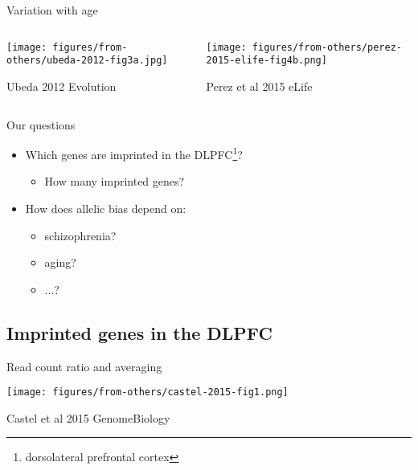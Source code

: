 \documentclass{beamer}
\begin{document}
\begin{frame}[label=previous-age-studies]{Variation with age}
\begin{columns}[t]
\begin{column}{0.5\textwidth}

\texttt{[image: figures/from-others/ubeda-2012-fig3a.jpg]}

{\tiny Ubeda 2012 Evolution}
\end{column}

\begin{column}{0.5\textwidth}

\texttt{[image: figures/from-others/perez-2015-elife-fig4b.png]}

{\tiny Perez et al 2015 eLife}
\end{column}
\end{columns}
\end{frame}

\begin{frame}{Our questions}
\begin{itemize}
\item Which genes are imprinted in the DLPFC\footnote{dorsolateral prefrontal
cortex}?
\begin{itemize}
\item How many imprinted genes?
\end{itemize}
\item How does allelic bias depend on:
\begin{itemize}
\item schizophrenia?
\item aging?
\item ...? 
\end{itemize}
\end{itemize}
\end{frame}

\subsection{Imprinted genes in the DLPFC}

\begin{frame}{Read count ratio and averaging}

\texttt{[image: figures/from-others/castel-2015-fig1.png]}

{\tiny Castel et al 2015 GenomeBiology}
\end{frame}
\end{document}
